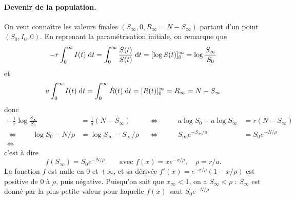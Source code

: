 \paragraph*{Devenir de la population.}
On veut connaître les valeurs finales $(S_\infty, 0, R_\infty = N - S_\infty)$ partant d'un point $(S_0, I_0, 0)$. En reprenant la paramétrisation initiale, on remarque que
$$
-r \int_0^\infty I(t) \; \text{d} t
= \int_0^\infty \frac{\dot S(t)}{S(t)} \; \text{d} t
= [\log S(t)]_0^\infty
= \log \frac{S_\infty}{S_0}
$$
et
$$
a \int_0^\infty I(t) \; \text{d} t
= \int_0^\infty \dot R(t) \; \text{d} t
= [R(t)]_0^\infty
= R_\infty = N - S_\infty
$$
donc
\begin{align*}
  -\frac1r \log \frac{S_\infty}{S_0} & = \frac1a (N - S_\infty) & 
  & \Leftrightarrow \qquad & 
  a \log {S_0} - a \log {S_\infty} & = r (N - S_\infty) \\
  \Leftrightarrow \qquad
  \log S_0  - N / \rho & = \log S_\infty - S_\infty / \rho &
  & \Leftrightarrow \qquad &
  S_\infty e^{- S_\infty/\rho} & = S_0 e^{- N / \rho} \\
  \Leftrightarrow \qquad
   &
\end{align*}
c'est à dire
$$
f(S_\infty) = S_0 e^{- N / \rho}
\qquad \text{avec } f(x) = x e^{-x/\rho},
\quad \rho = r/a.
$$
La fonction $f$ est nulle en 0 et $+\infty$, et sa dérivée $f'(x) = e^{-x/\rho}(1 - x/\rho)$ est positive de 0 à $\rho$, puis négative.
Puisqu'on sait que $x_\infty  < 1$, on a $S_\infty < \rho$ : $S_\infty$ est donné par la plus petite valeur pour laquelle $f(x)$ vaut $S_0 e^{- N / \rho}$
